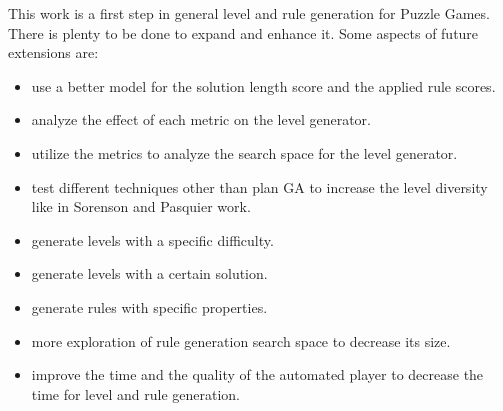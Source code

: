 This work is a first step in general level and rule generation for Puzzle Games. There is plenty to be done to expand and enhance it. Some aspects of future extensions are:
\begin{itemize} \itemsep0pt \parskip0pt 
	\item use a better model for the solution length score and the applied rule scores.
	\item analyze the effect of each metric on the level generator.
	\item utilize the metrics to analyze the search space for the level generator.
	\item test different techniques other than plan GA to increase the level diversity like in Sorenson and Pasquier work\cite{genericLevelFramework}.
	\item generate levels with a specific difficulty.
	\item generate levels with a certain solution.
	\item generate rules with specific properties.
	\item more exploration of rule generation search space to decrease its size.
	\item improve the time and the quality of the automated player to decrease the time for level and rule generation.
\end{itemize}